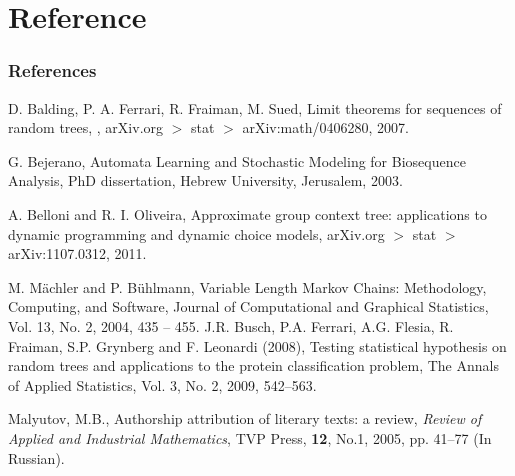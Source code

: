 \documentclass{beamer}
\begin{document}
\section{Reference}
\begin{frame}
\frametitle{References}
\footnotesize{
\begin{thebibliography}{99} %

 D. Balding, P. A. Ferrari,
R. Fraiman,  M. Sued, Limit theorems for sequences of random trees,
, arXiv.org $>$ stat $>$ arXiv:math/0406280, 2007.

 G. Bejerano, Automata Learning and Stochastic Modeling
for Biosequence Analysis, PhD dissertation, Hebrew University, Jerusalem, 2003.


 A. Belloni and R. I. Oliveira, Approximate group context tree: applications to dynamic programming and dynamic choice models, arXiv.org $>$ stat $>$ arXiv:1107.0312, 2011.



 M. M\"{a}chler and P. B\"{u}hlmann, Variable Length Markov
Chains: Methodology, Computing, and Software, Journal of
Computational and Graphical Statistics, Vol. 13, No. 2, 2004,
435 -- 455.
 J.R. Busch, P.A. Ferrari, A.G. Flesia, R. Fraiman, S.P. Grynberg and F. Leonardi (2008), Testing statistical hypothesis on random trees and applications to the protein classification problem, The Annals of Applied Statistics, Vol. 3, No. 2, 2009, 542--563.

 Malyutov, M.B., Authorship attribution of literary texts: a review, {\it {Review of Applied and
Industrial Mathematics}}, TVP Press,  {\bf 12}, No.1,  2005, pp. 41--77 (In Russian).
\end{thebibliography}
}
\end{frame}
\end{document}
